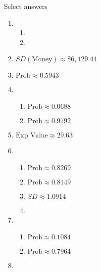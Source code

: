 \documentclass{article}
\begin{document}
Select answers\bigskip
\begin{enumerate}
    \item 
    \begin{enumerate}
        \item 
        \item 
    \end{enumerate}
    
    \item $SD(\text{Money}) \approx \$6,129.44$
    
    \item $\text{Prob} \approx 0.5943$
    
    \item 
    \begin{enumerate}
        \item $\text{Prob} \approx 0.0688$
        \item $\text{Prob} \approx 0.9792$
    \end{enumerate}
    
    \item $\text{Exp Value} \approx 29.63$
    
    \item 
    \begin{enumerate}
        \item $\text{Prob} \approx 0.8269$
        \item $\text{Prob} \approx 0.8149$
        \item $SD \approx 1.0914$
        \item 
    \end{enumerate}
    
    \item 
    \begin{enumerate}
        \item $\text{Prob} \approx 0.1084$
        \item $\text{Prob} \approx 0.7964$
    \end{enumerate}
    
    \item 
      
\end{enumerate}  
    
\end{document}
